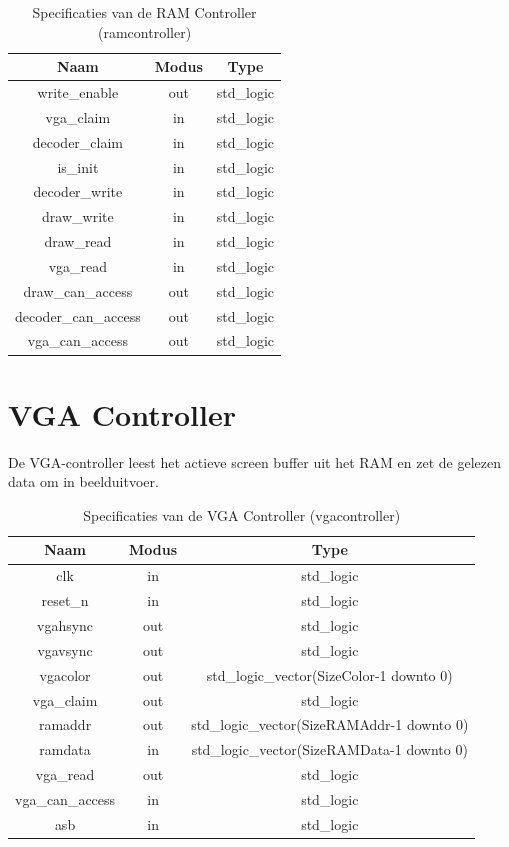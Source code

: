 \documentclass{scrreprt} %
\begin{document}
\begin{table}[H]
\centering
\caption{Specificaties van de RAM Controller (ramcontroller)}
\label{tab:spec-ramcontroller}
\begin{tabular}{c c c}
	\hline\hline
 	Naam & Modus & Type\\
 	\hline	
	write\_enable & out & std\_logic\\
	vga\_claim & in & std\_logic\\
	decoder\_claim & in & std\_logic\\
	is\_init & in & std\_logic\\
	decoder\_write & in & std\_logic\\
	draw\_write & in & std\_logic\\
	draw\_read & in & std\_logic\\
	vga\_read & in & std\_logic\\
	draw\_can\_access & out & std\_logic\\
	decoder\_can\_access & out & std\_logic\\
	vga\_can\_access & out & std\_logic\\
  	\hline
\end{tabular}
\end{table}

\section{VGA Controller}
De VGA-controller leest het actieve screen buffer uit het RAM en zet de gelezen data om in beelduitvoer.

\begin{table}[H]
\centering
\caption{Specificaties van de VGA Controller (vgacontroller)}
\label{tab:spec-vgacontroller}
\begin{tabular}{c c c}
	\hline\hline
 	Naam & Modus & Type\\
 	\hline	
	clk & in & std\_logic \\ 
	reset\_n & in & std\_logic \\ 
	vgahsync & out & std\_logic \\ 
	vgavsync & out & std\_logic \\ 
	vgacolor & out & std\_logic\_vector(SizeColor-1 downto 0) \\
	vga\_claim & out & std\_logic \\ 
	ramaddr & out & std\_logic\_vector(SizeRAMAddr-1 downto 0) \\
	ramdata & in & std\_logic\_vector(SizeRAMData-1 downto 0) \\ 
	vga\_read & out & std\_logic \\
	vga\_can\_access & in & std\_logic \\
	asb & in & std\_logic \\
  	\hline
\end{tabular}
\end{table}
\end{document}

